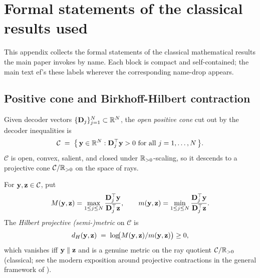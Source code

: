 

\section{Formal statements of the classical results used}\label{app:classical-defs}

This appendix collects the formal statements of the classical mathematical results the main paper invokes by name. Each block is compact and self-contained; the main text 
ef{}'s these labels wherever the corresponding name-drop appears.

\subsection{Positive cone and Birkhoff-Hilbert contraction}\label{sec:supp:hilbert}


\begin{definition}\label{def:supp:positive-cone}
Given decoder vectors $\{\mathbf{D}_j\}_{j=1}^{N}\subset\mathbb{R}^{N}$, the \emph{open positive cone} cut out by the decoder inequalities is
\[
\mathcal{C} \;=\; \bigl\{\,\mathbf{y}\in\mathbb{R}^{N} : \mathbf{D}_j^\top\mathbf{y}>0 \ \text{for all } j=1,\dots,N\,\bigr\}.
\]
$\mathcal{C}$ is open, convex, salient, and closed under $\mathbb{R}_{>0}$-scaling, so it descends to a projective cone $\mathcal{C}/\mathbb{R}_{>0}$ on the space of rays.
\end{definition}

\begin{definition}\label{def:supp:hilbert}
For $\mathbf{y},\mathbf{z}\in\mathcal{C}$, put
\[
M(\mathbf{y},\mathbf{z})=\max_{1\le j\le N}\frac{\mathbf{D}_j^\top\mathbf{y}}{\mathbf{D}_j^\top\mathbf{z}}, \qquad m(\mathbf{y},\mathbf{z})=\min_{1\le j\le N}\frac{\mathbf{D}_j^\top\mathbf{y}}{\mathbf{D}_j^\top\mathbf{z}}.
\]
The \emph{Hilbert projective (semi-)metric} on $\mathcal{C}$ is
\[
d_H(\mathbf{y},\mathbf{z}) \;=\; \log\!\bigl(M(\mathbf{y},\mathbf{z})/m(\mathbf{y},\mathbf{z})\bigr)\ge 0,
\]
which vanishes iff $\mathbf{y}\parallel\mathbf{z}$ and is a genuine metric on the ray quotient $\mathcal{C}/\mathbb{R}_{>0}$ (classical; see the modern exposition around projective contractions in the general framework of \citealt{rhodes1991topologies}).
\end{definition}

